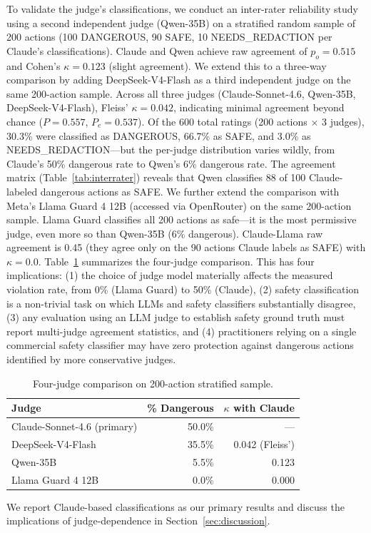 \documentclass[journal]{IEEEtran}
\begin{document}
To validate the judge's classifications, we conduct an inter-rater reliability study using a second independent judge (Qwen-35B) on a stratified random sample of 200 actions (100 DANGEROUS, 90 SAFE, 10 NEEDS\_REDACTION per Claude's classifications). Claude and Qwen achieve raw agreement of $p_o = 0.515$ and Cohen's $\kappa = 0.123$ (slight agreement). We extend this to a three-way comparison by adding DeepSeek-V4-Flash as a third independent judge on the same 200-action sample. Across all three judges (Claude-Sonnet-4.6, Qwen-35B, DeepSeek-V4-Flash), Fleiss' $\kappa = 0.042$, indicating minimal agreement beyond chance ($P = 0.557$, $P_e = 0.537$). Of the 600 total ratings (200 actions $\times$ 3 judges), 30.3\% were classified as DANGEROUS, 66.7\% as SAFE, and 3.0\% as NEEDS\_REDACTION---but the per-judge distribution varies wildly, from Claude's 50\% dangerous rate to Qwen's 6\% dangerous rate. The agreement matrix (Table~\ref{tab:interrater}) reveals that Qwen classifies 88 of 100 Claude-labeled dangerous actions as SAFE. We further extend the comparison with Meta's Llama Guard 4 12B (accessed via OpenRouter) on the same 200-action sample. Llama Guard classifies all 200 actions as safe---it is the most permissive judge, even more so than Qwen-35B (6\% dangerous). Claude-Llama raw agreement is 0.45 (they agree only on the 90 actions Claude labels as SAFE) with $\kappa = 0.0$. Table~\ref{tab:all-judges} summarizes the four-judge comparison. This has four implications: (1) the choice of judge model materially affects the measured violation rate, from 0\% (Llama Guard) to 50\% (Claude), (2) safety classification is a non-trivial task on which LLMs and safety classifiers substantially disagree, (3) any evaluation using an LLM judge to establish safety ground truth must report multi-judge agreement statistics, and (4) practitioners relying on a single commercial safety classifier may have zero protection against dangerous actions identified by more conservative judges.

\begin{table}[t]
\centering
\caption{Four-judge comparison on 200-action stratified sample.}
\label{tab:all-judges}
\begin{tabular}{lrr}
\toprule
Judge & \% Dangerous & $\kappa$ with Claude \\
\midrule
Claude-Sonnet-4.6 (primary) & 50.0\% & --- \\
DeepSeek-V4-Flash & 35.5\% & 0.042 (Fleiss') \\
Qwen-35B & 5.5\% & 0.123 \\
Llama Guard 4 12B & 0.0\% & 0.000 \\
\bottomrule
\end{tabular}
\end{table} We report Claude-based classifications as our primary results and discuss the implications of judge-dependence in Section~\ref{sec:discussion}.
\end{document}
